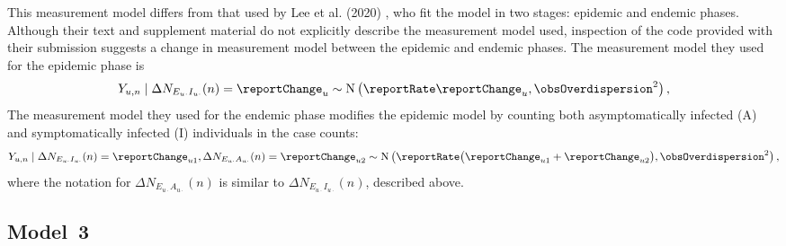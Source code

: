 This measurement model differs from that used by Lee et al. (2020) \cite{lee20}, who fit the model in two stages: epidemic and endemic phases.
Although their text and supplement material do not explicitly describe the measurement model used, inspection of the code provided with their submission suggests a change in measurement model between the epidemic and endemic phases.
The measurement model they used for the epidemic phase is
\begin{equation}
  \label{model2:measEpi}
  Y_{u, n} \mid \Delta N_{E_{u\cdot}I_{u\cdot}}(n) = \reportChange_u \sim \text{N}\left(\reportRate \reportChange_u, \obsOverdispersion^2 \right),
\end{equation}
The measurement model they used for the endemic phase modifies the epidemic model by counting both asymptomatically infected (A) and symptomatically infected (I) individuals in the case counts:
\begin{equation}
  \label{model2:measEnd}
  Y_{u, n} \mid \Delta N_{E_{u\cdot}I_{u\cdot}}(n) = \reportChange_{u1}, \Delta N_{E_{u\cdot}A_{u\cdot}}(n) = \reportChange_{u2} \sim \text{N}\left(\reportRate \big(\reportChange_{u1} + \reportChange_{u2}\big), \obsOverdispersion^2 \right),
\end{equation}
where the notation for $\Delta N_{E_{u\cdot}A_{u\cdot}}(n)$ is similar to $\Delta N_{E_{u\cdot}I_{u\cdot}}(n)$, described above.

\subsection{Model~3}

